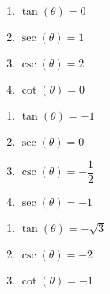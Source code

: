 \begin{multicols}{4}

\begin{enumerate}

\setcounter{enumi}{\value{HW}}

\item $\tan(\theta) = 0$
\item $\sec(\theta) = 1$
\item $\csc(\theta) = 2$
\item $\cot(\theta) = 0$

\setcounter{HW}{\value{enumi}}

\end{enumerate}

\end{multicols}

\begin{multicols}{4}

\begin{enumerate}

\setcounter{enumi}{\value{HW}}

\item $\tan(\theta) = -1$ 
\item $\sec(\theta) = 0$ 
\item $\csc(\theta) = -\dfrac{1}{2}$
\item  $\sec(\theta) = -1$ 

\setcounter{HW}{\value{enumi}}

\end{enumerate}

\end{multicols}

\begin{multicols}{4}

\begin{enumerate}

\setcounter{enumi}{\value{HW}}

\item  $\tan(\theta) = -\sqrt{3}$
\item  $\csc(\theta) = -2$ 
\item  $\cot(\theta) = -1$  \label{circequanglelast}

\setcounter{HW}{\value{enumi}}

\end{enumerate}

\end{multicols}

